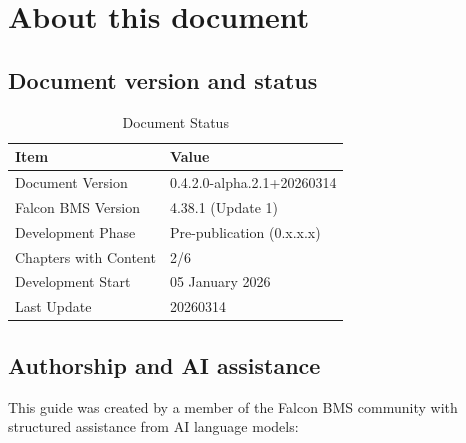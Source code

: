 \documentclass[11pt, a4paper, twoside]{report}
\newcommand{\docversion}{0.4.2.0-alpha.2.1}
\newcommand{\docbuild}{20260314}
\newcommand{\docstartdate}{05 January 2026}
\newcommand{\docenddate}{20260314}
\newcommand{\chapterscompletedof}{2/6}
\newcommand{\fulldocversion}{\docversion+\docbuild}
\begin{document}
\section{About this document}
\label{sec:C1-S4}

\subsection{Document version and status}
\label{sec:C1-S4-S1}

\begin{table}[H]
	\centering
	\caption{Document Status}
	\label{tab:C1-doc-status}
	\small
	\renewcommand{\arraystretch}{1.25}
	\begin{tabular}{L{4.5cm} L{9.0cm}}
		\toprule
		\textbf{Item} & \textbf{Value} \\
		\midrule
		Document Version & \fulldocversion \\
		Falcon BMS Version & 4.38.1 (Update 1) \\
		Development Phase & Pre-publication (0.x.x.x) \\
		Chapters with Content & \chapterscompletedof \\
		Development Start & \docstartdate \\
		Last Update & \docenddate \\
		\bottomrule
	\end{tabular}
\end{table}

\subsection{Authorship and AI assistance}
\label{sec:C1-S4-S2}

This guide was created by a member of the Falcon BMS community with structured assistance from AI language models:
\end{document}
